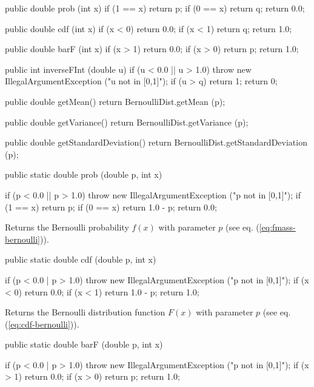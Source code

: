 \begin{code}\begin{hide}
   public double prob (int x) {
      if (1 == x) return p;
      if (0 == x) return q;
      return 0.0;
   }

   public double cdf (int x) {
      if (x < 0) return 0.0;
      if (x < 1) return q;
      return 1.0;
   }

   public double barF (int x) {
      if (x > 1) return 0.0;
      if (x > 0) return p;
      return 1.0;
   }

   public int inverseFInt (double u) {
      if (u < 0.0 || u > 1.0)
         throw new IllegalArgumentException ("u not in [0,1]");
      if (u > q) return 1;
      return 0;
   }

   public double getMean() {
      return BernoulliDist.getMean (p);
   }

   public double getVariance() {
      return BernoulliDist.getVariance (p);
   }

   public double getStandardDeviation() {
      return BernoulliDist.getStandardDeviation (p);
   }

\end{hide}

   public static double prob (double p, int x)\begin{hide} {
      if (p < 0.0 || p > 1.0)
         throw new IllegalArgumentException ("p not in [0,1]");
      if (1 == x) return p;
      if (0 == x) return 1.0 - p;
      return 0.0;
   }\end{hide}
\end{code}
\begin{tabb} Returns the Bernoulli probability $f(x)$  with parameter $p$
(see eq. (\ref{eq:fmass-bernoulli})).
\end{tabb}
\begin{code}

   public static double cdf (double p, int x)\begin{hide} {
      if (p < 0.0 | p > 1.0)
         throw new IllegalArgumentException ("p not in [0,1]");
      if (x < 0) return 0.0;
      if (x < 1) return 1.0 - p;
      return 1.0;
   }\end{hide}
\end{code}
  \begin{tabb}  Returns the Bernoulli distribution function $F(x)$
 with parameter $p$ (see eq. (\ref{eq:cdf-bernoulli})).
 \end{tabb}
\begin{code}

   public static double barF (double p, int x)\begin{hide} {
      if (p < 0.0 | p > 1.0)
         throw new IllegalArgumentException ("p not in [0,1]");
      if (x > 1) return 0.0;
      if (x > 0) return p;
      return 1.0;
   }\end{hide}
\end{code}

